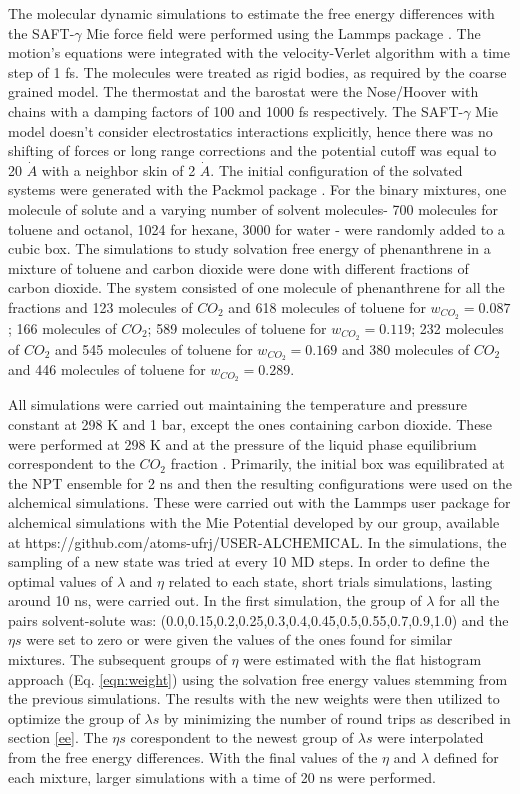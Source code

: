 The molecular dynamic simulations to estimate the free energy differences with the SAFT-$\gamma$ Mie force field were performed using the Lammps package \cite{lammps}. The motion's equations were integrated with the velocity-Verlet algorithm \cite{verlet} with a time step of 1 fs. The molecules were treated as rigid bodies, as required by the coarse grained model. The thermostat and the barostat were the Nose/Hoover with chains with a damping factors of 100 and 1000 fs respectively. The SAFT-$\gamma$ Mie model doesn't consider electrostatics interactions explicitly, hence there was no shifting of forces or long range corrections and the potential cutoff was equal to 20 $\dot{A}$ with a neighbor skin of 2 $\dot{A}$. The initial configuration of the  solvated systems were generated with the Packmol package \cite{packmol}. For the binary mixtures, one molecule of solute and a varying number of solvent molecules- 700 molecules for toluene and octanol, 1024 for hexane, 3000 for water - were randomly added to a cubic box. The simulations to study solvation free energy of phenanthrene in a mixture of toluene and carbon dioxide were done with different fractions of carbon dioxide. The  system consisted of one molecule of phenanthrene for all the fractions and 123 molecules of $CO_{2}$ and 618 molecules of toluene for $w_{CO_{2}} = 0.087$; 166 molecules of $CO_{2}$; 589 molecules of toluene for $w_{CO_{2}} = 0.119$; 232 molecules of $CO_{2}$ and 545 molecules of toluene for $w_{CO_{2}} = 0.169$ and 380 molecules of $CO_{2}$ and 446 molecules of toluene for $w_{CO_{2}} = 0.289$.

All simulations were carried out maintaining the temperature and pressure constant at 298 K and 1 bar, except the ones containing carbon dioxide. These were performed at 298 K and at the pressure of the liquid phase equilibrium correspondent to the $CO_{2}$ fraction \cite{co2toliq}. Primarily, the initial box was equilibrated at the NPT ensemble for 2 ns and then the resulting configurations were used on the alchemical simulations. These were carried out with the Lammps user package for alchemical simulations with the Mie Potential developed by our group, available at https://github.com/atoms-ufrj/USER-ALCHEMICAL. In the simulations, the sampling of a new state was tried at every 10 MD steps. In order to define the optimal values of $\lambda$ and $\eta$ related to each state, short trials simulations, lasting around 10 ns, were carried out. In the first simulation, the group of $\lambda$ for all the pairs solvent-solute was: (0.0,0.15,0.2,0.25,0.3,0.4,0.45,0.5,0.55,0.7,0.9,1.0) and the $\eta s$ were set to zero or were given the values of the ones found for similar mixtures. The subsequent groups of $\eta$ were estimated  with the flat histogram approach (Eq. \eqref{eqn:weight}) using the solvation free energy values stemming from the previous simulations. The results with the new weights were then utilized to optimize the group of $\lambda s$ by minimizing the number of round trips as described in section \ref{ee}. The $\eta s$ corespondent to the newest group of $\lambda s$ were interpolated from the free energy differences. With the final values of the $\eta$ and $\lambda $ defined for each mixture, larger simulations with a time of 20 ns were performed. 

